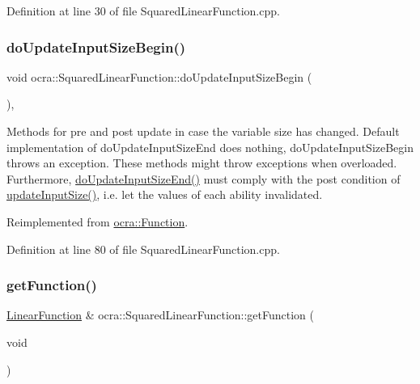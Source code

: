 Definition at line 30 of file Squared\+Linear\+Function.\+cpp.

\hypertarget{classocra_1_1SquaredLinearFunction_a95faea59867ec734fbdb46d936067d77}{}\label{classocra_1_1SquaredLinearFunction_a95faea59867ec734fbdb46d936067d77} 
\subsubsection{\texorpdfstring{do\+Update\+Input\+Size\+Begin()}{doUpdateInputSizeBegin()}}
{\footnotesize\ttfamily void ocra\+::\+Squared\+Linear\+Function\+::do\+Update\+Input\+Size\+Begin (\begin{DoxyParamCaption}{ }\end{DoxyParamCaption})\hspace{0.3cm}{\ttfamily [protected]}, {\ttfamily [virtual]}}

Methods for pre and post update in case the variable size has changed. Default implementation of do\+Update\+Input\+Size\+End does nothing, do\+Update\+Input\+Size\+Begin throws an exception. These methods might throw exceptions when overloaded. Furthermore, {\ttfamily \hyperlink{classocra_1_1QuadraticFunction_ab3d5478fd8ded343453e0489c595e580}{do\+Update\+Input\+Size\+End()}} must comply with the post condition of {\ttfamily \hyperlink{classocra_1_1Function_a3a5b9e6ae296339acc87ab2cbf97ef98}{update\+Input\+Size()}}, i.\+e. let the values of each ability invalidated. 

Reimplemented from \hyperlink{classocra_1_1Function_a3f728f3758e6448aa59932853db5ddcc}{ocra\+::\+Function}.



Definition at line 80 of file Squared\+Linear\+Function.\+cpp.

\hypertarget{classocra_1_1SquaredLinearFunction_aff22d70c8edf05b5b488ffe6ce426e87}{}\label{classocra_1_1SquaredLinearFunction_aff22d70c8edf05b5b488ffe6ce426e87} 
\subsubsection{\texorpdfstring{get\+Function()}{getFunction()}\hspace{0.1cm}{\footnotesize\ttfamily [1/2]}}
{\footnotesize\ttfamily \hyperlink{classocra_1_1LinearFunction}{Linear\+Function} \& ocra\+::\+Squared\+Linear\+Function\+::get\+Function (\begin{DoxyParamCaption}\item[{void}]{ }\end{DoxyParamCaption})}



